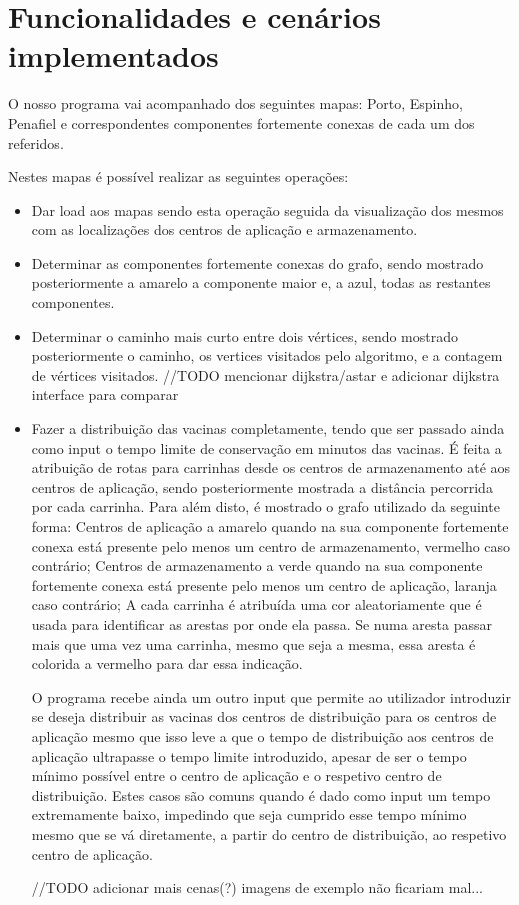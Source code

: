 \documentclass[12pt,a4paper]{report}
\begin{document}
\chapter{Funcionalidades e cenários implementados}
\label{func}
O nosso programa vai acompanhado dos seguintes mapas: Porto, Espinho, Penafiel e correspondentes componentes
fortemente conexas de cada um dos referidos. \par

Nestes mapas é possível realizar as seguintes operações:
\begin{itemize}
	\item Dar load aos mapas sendo esta operação seguida da visualização dos mesmos com as localizações dos centros
		de aplicação e armazenamento.
	\item Determinar as componentes fortemente conexas do grafo, sendo mostrado posteriormente a amarelo a componente maior e, a azul,
		todas as restantes componentes.
	\item Determinar o caminho mais curto entre dois vértices, sendo mostrado posteriormente o caminho, os vertices visitados
		pelo algoritmo, e a contagem de vértices visitados.
		//TODO mencionar dijkstra/astar e adicionar dijkstra interface para comparar
	\item Fazer a distribuição das vacinas completamente, tendo que ser passado ainda como input o tempo limite de conservação em minutos das vacinas.
		É feita a atribuição de rotas para carrinhas desde os centros de armazenamento até aos centros de aplicação,
		sendo posteriormente mostrada a distância percorrida por cada carrinha. Para além disto, é mostrado o grafo utilizado
		da seguinte forma: Centros de aplicação a amarelo quando na sua componente fortemente conexa está presente pelo menos um centro de armazenamento, vermelho caso contrário;
		Centros de armazenamento a verde quando na sua componente fortemente conexa está presente pelo menos um centro de aplicação, laranja caso contrário;
		A cada carrinha é atribuída uma cor aleatoriamente que é usada para identificar as arestas por onde ela passa. Se numa aresta passar mais que uma vez uma carrinha, mesmo que seja a mesma,
		essa aresta é colorida a vermelho para dar essa indicação. \par

		O programa recebe ainda um outro input que permite ao utilizador introduzir se deseja distribuir as vacinas dos centros de distribuição para os centros de aplicação mesmo que isso 
		leve a que o tempo de distribuição aos centros de aplicação ultrapasse o tempo limite introduzido, apesar de ser o tempo mínimo possível entre o centro de aplicação e o respetivo
		centro de distribuição. Estes casos são comuns quando é dado como input um tempo extremamente baixo, impedindo que seja cumprido esse tempo mínimo mesmo que se vá diretamente, a partir do centro
		de distribuição, ao respetivo centro de aplicação. \par

		//TODO adicionar mais cenas(?) imagens de exemplo não ficariam mal...

\end{itemize}
\end{document}
